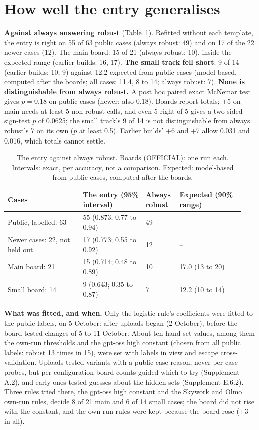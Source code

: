 \documentclass{article}
\begin{document}
\section{How well the entry generalises}
\label{sec:audit}
\label{sec:noise}

\textbf{Against always answering robust} (Table~\ref{tab:audit}). Refitted without each template, the entry is right
on 55 of 63 public cases (always robust: 49) and on 17 of the 22 newer cases (12). The main board: 15 of 21 (always
robust: 10), inside the expected range (earlier builds: 16, 17). \textbf{The small track fell short}: 9 of 14 (earlier
builds: 10, 9) against 12.2 expected from public cases (model-based, computed after the boards; all cases: 11.4, 8 to
14; always robust: 7). \textbf{None is distinguishable from always robust.} A post hoc paired exact McNemar test gives
$p = 0.18$ on public cases (newer: also 0.18). Boards report totals; +5 on main needs at least 5 non-robust calls, and
even 5 right of 5 gives a two-sided sign-test $p$ of 0.0625; the small track's 9 of 14 is not distinguishable from
always robust's 7 on its own ($p$ at least 0.5). Earlier builds' +6 and +7 allow 0.031 and 0.016, which totals cannot
settle.

\begin{table}[t]
\caption{The entry against always robust. Boards (OFFICIAL): one run each. Intervals: exact, per accuracy, not a
comparison. Expected: model-based from public cases, computed after the boards.}
\label{tab:audit}
\centering
\small
\setlength{\tabcolsep}{3pt}
\begin{tabular}{@{}p{0.30\linewidth}p{0.25\linewidth}p{0.13\linewidth}p{0.26\linewidth}@{}}
\toprule
Cases & The entry (95\% interval) & Always robust & Expected (90\% range) \\
\midrule
Public, labelled: 63 & 55 (0.873; 0.77 to 0.94) & 49 & -- \\
Newer cases: 22, not held out & 17 (0.773; 0.55 to 0.92) & 12 & -- \\
Main board: 21 & 15 (0.714; 0.48 to 0.89) & 10 & 17.0 (13 to 20) \\
Small board: 14 & 9 (0.643; 0.35 to 0.87) & 7 & 12.2 (10 to 14) \\
\bottomrule
\end{tabular}
\end{table}

\textbf{What was fitted, and when.} Only the logistic rule's coefficients were fitted to the public labels, on 5
October: after uploads began (2 October), before the board-tested changes of 5 to 11 October. About ten hand-set values,
among them the own-run thresholds and the gpt-oss high constant (chosen from all public labels: robust 13 times in 15),
were set with labels in view and escape cross-validation. Uploads tested variants with a public-case reason, never
per-case probes, but per-configuration board counts guided which to try (Supplement A.2), and early ones tested guesses
about the hidden sets (Supplement E.6.2). Three rules tried there, the
gpt-oss high constant and the Skywork and Olmo own-run rules, decide 8 of 21 main and 6 of 14 small cases; the board did
not rise with the constant, and the own-run rules were kept because the board rose (+3 in all).
\end{document}
